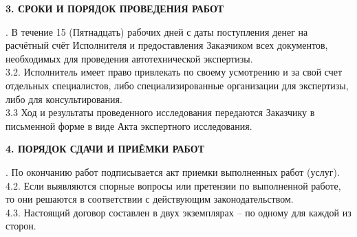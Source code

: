 \begin{center}
	\textbf{3. СРОКИ И ПОРЯДОК ПРОВЕДЕНИЯ РАБОТ}
\end{center}
\vspace{-3mm}
 . В течение 15 (Пятнадцать) рабочих дней с даты поступления денег на расчётный счёт
Исполнителя и предоставления Заказчиком всех документов,
необходимых для проведения автотехнической экспертизы.\\
3.2. Исполнитель имеет право привлекать по своему усмотрению и за свой счет отдельных 
специалистов, либо специализированные организации для экспертизы, либо для консультирования.\\
3.3 Ход и результаты проведенного исследования передаются Заказчику в письменной форме в виде Акта экспертного исследования.
\begin{center}
	\textbf{4. ПОРЯДОК СДАЧИ И ПРИЁМКИ РАБОТ}
\end{center}
\vspace{-3mm}
 . По окончанию работ подписывается акт приемки выполненных работ (услуг).\\
4.2. Если выявляются спорные вопросы или претензии по выполненной работе, то они решаются в соответствии с действующим законодательством.\\
4.3. Настоящий договор составлен в двух экземплярах – по одному для каждой из сторон.

